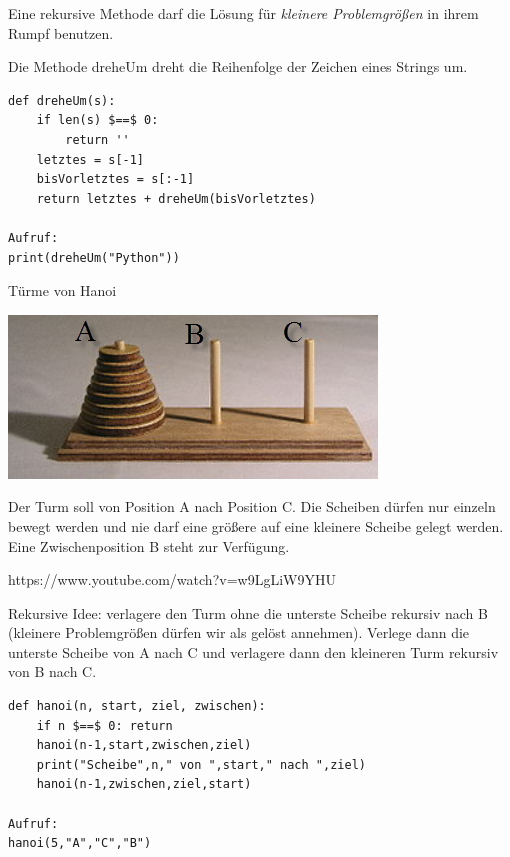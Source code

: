 \documentclass{beamer}
\begin{document}
\begin{frame}[fragile]
Eine rekursive Methode darf die Lösung für \textit{kleinere Problemgrößen} in ihrem Rumpf benutzen. \pause

Die Methode dreheUm dreht die Reihenfolge der Zeichen eines Strings um. \pause
\begin{lstlisting} 
def dreheUm(s):
    if len(s) $==$ 0:
        return ''
    letztes = s[-1]
    bisVorletztes = s[:-1]
    return letztes + dreheUm(bisVorletztes)

Aufruf:
print(dreheUm("Python"))
\end{lstlisting} 
\end{frame}

\begin{frame}[fragile]
Türme von Hanoi

\includegraphics[scale=0.6]{Hanoi.png} \pause

Der Turm soll von Position A nach Position C. Die Scheiben dürfen nur einzeln bewegt werden und nie darf eine größere auf eine kleinere Scheibe gelegt werden. Eine Zwischenposition B steht zur Verfügung. 

https://www.youtube.com/watch?v=w9LgLiW9YHU \pause

Rekursive Idee: verlagere den Turm ohne die unterste Scheibe rekursiv nach B (kleinere Problemgrößen dürfen wir als
gelöst annehmen). Verlege dann die unterste Scheibe von A nach C und verlagere dann den kleineren Turm rekursiv von B nach C.
\end{frame}

\begin{frame}[fragile]
\begin{lstlisting} 
def hanoi(n, start, ziel, zwischen):
    if n $==$ 0: return
    hanoi(n-1,start,zwischen,ziel)
    print("Scheibe",n," von ",start," nach ",ziel)
    hanoi(n-1,zwischen,ziel,start)
    
Aufruf:
hanoi(5,"A","C","B")
\end{lstlisting} 
\end{frame}
\end{document}
